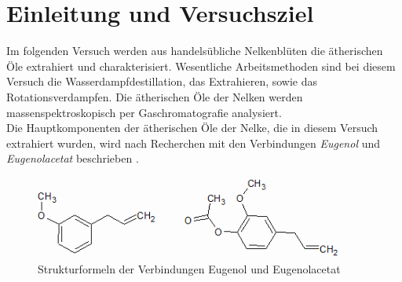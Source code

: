 \section{Einleitung und Versuchsziel}
\label{sec:aufgabenstellung}

Im folgenden Versuch werden aus handelsübliche Nelkenblüten die ätherischen Öle extrahiert und charakterisiert. Wesentliche Arbeitsmethoden sind bei diesem Versuch die Wasserdampfdestillation, das Extrahieren, sowie das Rotationsverdampfen. Die ätherischen Öle der Nelken werden massenspektroskopisch per  Gaschromatografie analysiert.\\
Die Hauptkomponenten der ätherischen Öle der Nelke, die in diesem Versuch extrahiert wurden, wird nach Recherchen mit den Verbindungen \textit{Eugenol} und \textit{Eugenolacetat} beschrieben \cite{Berger.2017,Krammer.2003}.

\begin{figure}[h!]
	\centering
	\includegraphics[width=0.9\textwidth]{img/Eugenol_Eugenolacetat.png}
	\caption{Strukturformeln der Verbindungen Eugenol und Eugenolacetat}
\end{figure}
\FloatBarrier
